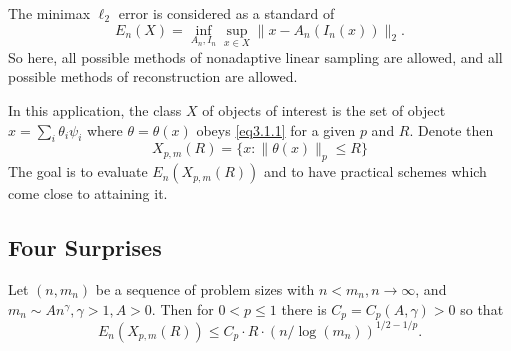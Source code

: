 The minimax $\ell_2$ error is considered as a standard of 
\begin{equation*}
    E_n(X) = \inf\limits_{A_n,I_n} \sup\limits_{x \in X} \|x-A_n(I_n(x))\|_2.
\end{equation*}
So here, all possible methods of nonadaptive linear sampling are allowed, and all possible methods of reconstruction are allowed. 

In this application, the class $X$ of objects of interest is the set of object $x = \sum_i\theta_i\psi_i$ where $\theta = \theta(x)$ obeys \cref{eq3.1.1} for a given $p$ and $R$. Denote then
\begin{equation*}
    X_{p,m}(R) = \{x:\|\theta(x)\|_p \leq R\} 
\end{equation*}
The goal is to evaluate $E_n(X_{p,m}(R))$ and to have practical schemes which come close to attaining it.


\subsection{Four Surprises}
\begin{theorem}
    Let $(n, m_n)$ be a sequence of problem sizes with $n<m_n, n \rightarrow \infty$, and $m_n \sim An^{\gamma}, \gamma > 1, A>0$. Then for $0<p\leq 1$ there is $C_p = C_p(A,\gamma)>0$ so that
    \begin{equation}
        E_n(X_{p,m}(R)) \leq C_p \cdot R \cdot (n/\log (m_n))^{1/2-1/p}
        \label{eq3.1.3}.
    \end{equation}
    \label{th3.1}
\end{theorem}

